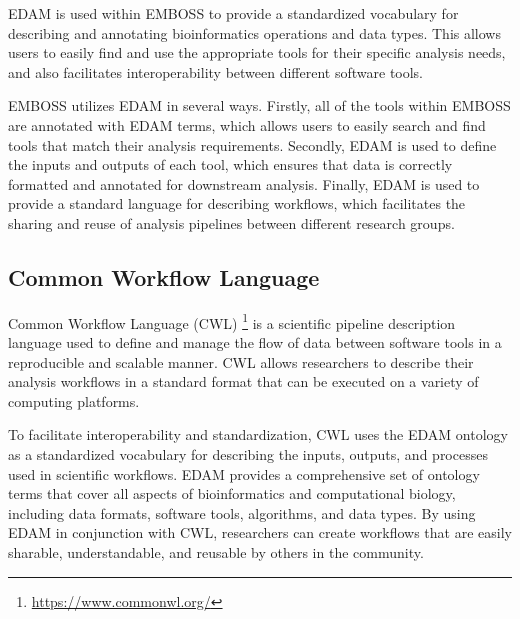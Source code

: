 \documentclass{scrartcl}
\begin{document}
EDAM is used within EMBOSS to provide a standardized vocabulary for describing and annotating 
  bioinformatics operations and data types. 
  This allows users to easily find and use the appropriate tools for their specific analysis needs, 
  and also facilitates interoperability between different software tools.

EMBOSS utilizes EDAM in several ways. Firstly, all of the tools within EMBOSS are annotated with EDAM terms, 
  which allows users to easily search and find tools that match their analysis requirements. 
  Secondly, EDAM is used to define the inputs and outputs of each tool, which ensures that data is correctly 
  formatted and annotated for downstream analysis. Finally, EDAM is used to provide a standard language for 
  describing workflows, which facilitates the sharing and reuse of analysis pipelines between 
  different research groups.


\subsection{Common Workflow Language}

Common Workflow Language (CWL) \cite{cwl} \footnote{\url{https://www.commonwl.org/}} is a scientific pipeline description language used to define and manage the 
  flow of data between software tools in a reproducible and scalable manner. CWL allows researchers to 
  describe their analysis workflows in a standard format that can be executed on a variety of computing 
  platforms.

To facilitate interoperability and standardization, CWL uses the EDAM ontology as a standardized 
  vocabulary for describing the inputs, outputs, and processes used in scientific workflows. 
  EDAM provides a comprehensive set of ontology terms that cover all aspects of bioinformatics and 
  computational biology, including data formats, software tools, algorithms, and data types. 
  By using EDAM in conjunction with CWL, researchers can create workflows that are easily sharable, 
  understandable, and reusable by others in the community.


\newpage
{}
\printbibliography %
\end{document}
